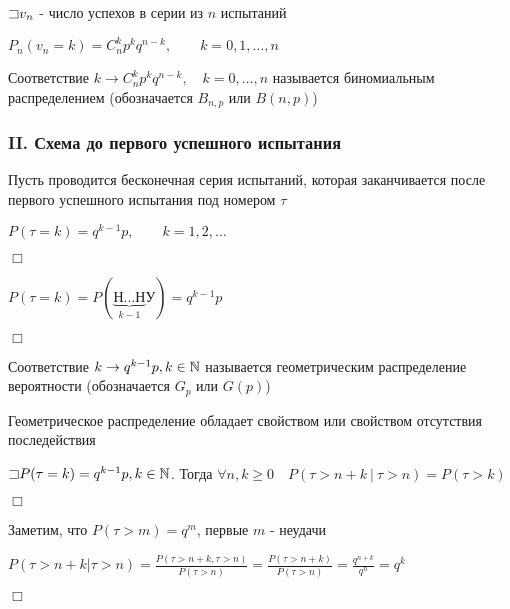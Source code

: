 \documentclass[12pt]{article}
\begin{document}
    $\mathord{\sqsupset} v_n$ - число успехов в серии из $n$ испытаний

    $P_n(v_n = k) = C^k_n p^k q^{n - k}, \quad\quad k = 0, 1, \dots, n$

    \hypertarget{binomialdistribution}{}

    \Def Соответствие $k \rightarrow C^k_n p^k q^{n - k}, \quad k = 0, \dots, n$ называется биномиальным распределением
    (обозначается $B_{n,p}$ или $B(n, p)$)

    \hypertarget{untilfirstsuccessschema}{}

    \subsubsection{II. Схема до первого успешного испытания}

    Пусть проводится бесконечная серия испытаний, которая заканчивается после первого успешного испытания
    под номером $\tau$

    \begin{MyTheorem}
        \Ths $P(\tau = k) = q^{k - 1} p, \quad\quad k = 1, 2, \dots$
    \end{MyTheorem}

    \begin{MyProof}
        $\Box$

        $P(\tau = k) = P(\underset{k - 1}{\underbrace{\text{Н}\dots\text{Н}}}\text{У}) = q^{k - 1}p$

        $\Box$
    \end{MyProof}

    \hypertarget{geometricdistribution}{}

    \Def Соответствие $k \rightarrow q^{k - 1} p, k \in \mathbb{N}$ называется геометрическим
    распределение вероятности (обозначается $G_p$ или $G(p)$)

    \Nota Геометрическое распределение обладает свойством  или свойством отсутствия
    последействия

    \begin{MyTheorem}
        \Ths $\mathord{\sqsupset} P(\tau = k) = q^{k - 1} p, k \in \mathbb{N}$. Тогда $\forall n, k \geq 0 \quad P(\tau > n + k \ | \ \tau > n) = P(\tau > k)$
    \end{MyTheorem}

    \begin{MyProof}
        $\Box$

        Заметим, что $P(\tau > m) = q^m$, первые $m$ - неудачи

        $P(\tau > n + k | \tau > n) = \frac{P(\tau > n + k, \tau > n)}{P(\tau > n)} = \frac{P(\tau > n + k)}{P(\tau > n)} = \frac{q^{n + k}}{q^n} = q^k$

        $\Box$
    \end{MyProof}
\end{document}
